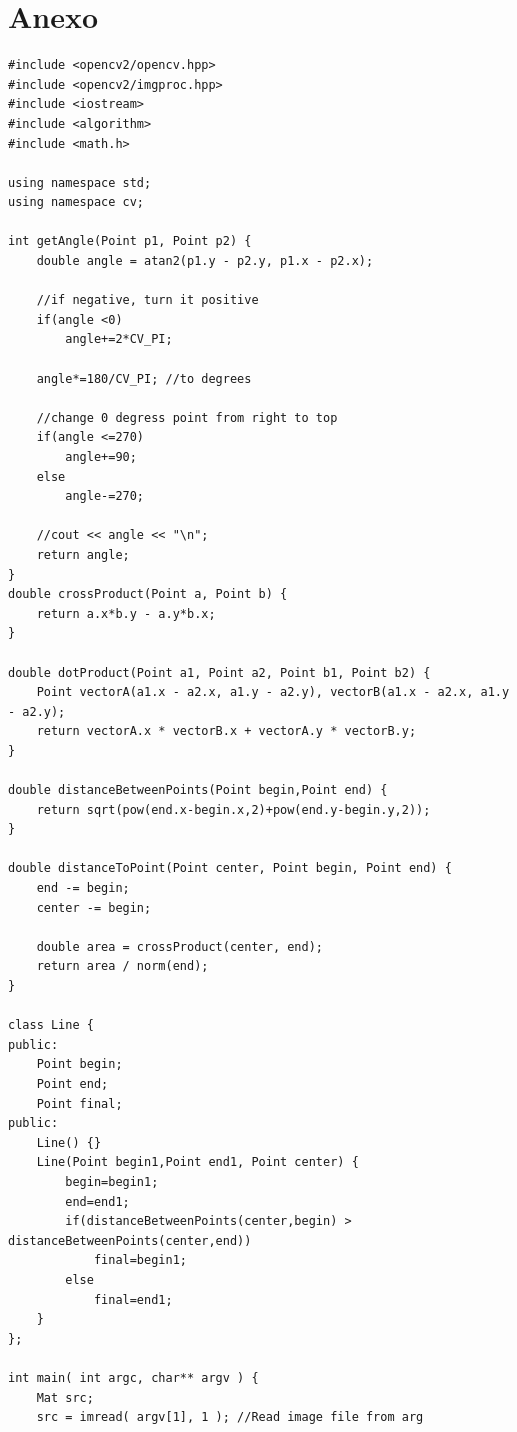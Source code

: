 \documentclass[a4paper]{article}
\begin{document}
\pagebreak
\section*{Anexo}

\begin{frame}

\begin{lstlisting}
#include <opencv2/opencv.hpp>
#include <opencv2/imgproc.hpp>
#include <iostream>
#include <algorithm>
#include <math.h>

using namespace std;
using namespace cv;

int getAngle(Point p1, Point p2) {
	double angle = atan2(p1.y - p2.y, p1.x - p2.x);

	//if negative, turn it positive
	if(angle <0)
		angle+=2*CV_PI;

	angle*=180/CV_PI; //to degrees

	//change 0 degress point from right to top
	if(angle <=270)
		angle+=90;
	else
		angle-=270;

	//cout << angle << "\n";
	return angle;
}
double crossProduct(Point a, Point b) {
	return a.x*b.y - a.y*b.x;
}

double dotProduct(Point a1, Point a2, Point b1, Point b2) {
	Point vectorA(a1.x - a2.x, a1.y - a2.y), vectorB(a1.x - a2.x, a1.y - a2.y);
	return vectorA.x * vectorB.x + vectorA.y * vectorB.y;
}

double distanceBetweenPoints(Point begin,Point end) {
	return sqrt(pow(end.x-begin.x,2)+pow(end.y-begin.y,2));
}

double distanceToPoint(Point center, Point begin, Point end) {
	end -= begin;
	center -= begin;

	double area = crossProduct(center, end);
	return area / norm(end);
}

class Line {
public:
	Point begin;
	Point end;
	Point final;
public:
	Line() {}
	Line(Point begin1,Point end1, Point center) {
		begin=begin1;
		end=end1;
		if(distanceBetweenPoints(center,begin) > distanceBetweenPoints(center,end))
			final=begin1;
		else
			final=end1;
	}
};

int main( int argc, char** argv ) {
	Mat src;
	src = imread( argv[1], 1 ); //Read image file from arg


\end{lstlisting}
\end{frame}
\end{document}
